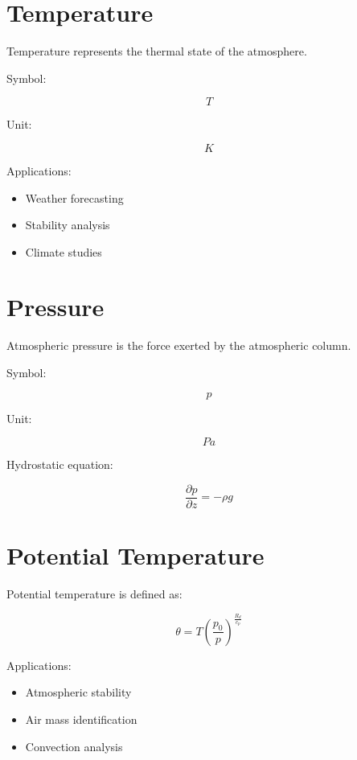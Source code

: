 \section{Temperature}

Temperature represents the thermal state of the atmosphere.

Symbol:

\[
T
\]

Unit:

\[
K
\]

Applications:

\begin{itemize}
\item Weather forecasting
\item Stability analysis
\item Climate studies
\end{itemize}



\section{Pressure}

Atmospheric pressure is the force exerted by the atmospheric column.

Symbol:

\[
p
\]

Unit:

\[
Pa
\]


Hydrostatic equation:

\begin{equation}
\frac{\partial p}{\partial z}
=
-\rho g
\end{equation}



\section{Potential Temperature}

Potential temperature is defined as:

\begin{equation}
\theta =
T
\left(
\frac{p_0}{p}
\right)^{\frac{R_d}{c_p}}
\end{equation}


Applications:

\begin{itemize}

\item Atmospheric stability

\item Air mass identification

\item Convection analysis

\end{itemize}
